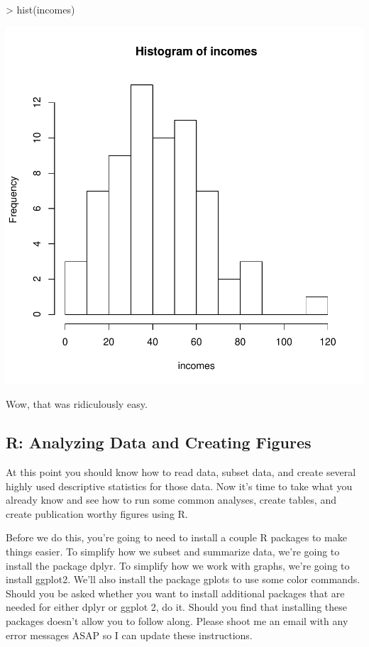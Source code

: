 \documentclass[12pt]{article}
\begin{document}
\begin{Schunk}
\begin{Sinput}
> hist(incomes)
\end{Sinput}
\end{Schunk}
\includegraphics{Reproducibility-033}

Wow, that was ridiculously easy.

\subsection{R: Analyzing Data and Creating Figures}
At this point you should know how to read data, subset data, and create several
highly used descriptive statistics for those data. Now it's time to take what
you already know and see how to run some common analyses, create tables, and
create publication worthy figures using R.

Before we do this, you're going to need to install a couple R packages to make
things easier. To simplify how we subset and summarize data, we're going
to install the package dplyr. To simplify how we work with graphs, we're going
to install ggplot2. We'll also install the package gplots to use some color
commands. Should you be asked whether you want to install additional
packages that are needed for either dplyr or ggplot 2, do it. Should you find
that installing these packages doesn't allow you to follow along. Please shoot
me an email with any error messages ASAP so I can update these instructions.
\end{document}
